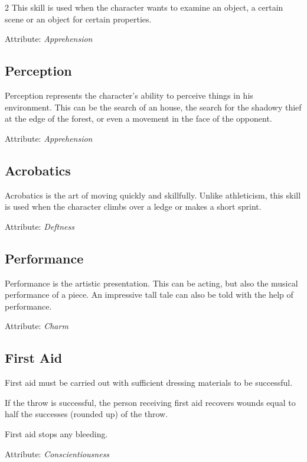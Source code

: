 \begin{multicols}{2}
This skill is used when the character wants to examine an object, a certain scene or an object for certain properties.

Attribute: \textit{Apprehension}

\subsection{Perception}

Perception represents the character's ability to perceive things in his environment. This can be the search of an house, the search for the shadowy thief at the edge of the forest, or even a movement in the face of the opponent.

Attribute: \textit{Apprehension}

\subsection{Acrobatics}

Acrobatics is the art of moving quickly and skillfully. Unlike athleticism, this skill is used when the character climbs over a ledge or makes a short sprint.

Attribute: \textit{Deftness}

\subsection{Performance}

Performance is the artistic presentation. This can be acting, but also the musical performance of a piece. An impressive tall tale can also be told with the help of performance.

Attribute: \textit{Charm}

\subsection{First Aid}

First aid must be carried out with sufficient dressing materials to be successful.

If the throw is successful, the person receiving first aid recovers wounds equal to half the successes (rounded up) of the throw.

First aid stops any bleeding.

Attribute: \textit{Conscientiousness}


\end{multicols}
